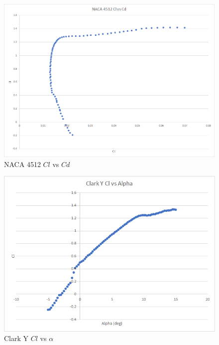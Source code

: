 \documentclass{article}
\begin{document}
\begin{figure}[!h]
\begin{center}
	\includegraphics[scale=0.7]{NACA4512clvscd_new.png}
	\caption{NACA 4512 $Cl$ vs $Cd$}
	\label{Figure 2:}
\end{center}
\end{figure}
\newpage

\begin{figure}[!h]
\begin{center}
	\includegraphics[scale=1]{Clarkyclvsalpha.png}
	\caption{Clark Y $Cl$ vs $\alpha$}
	\label{Figure 3:}
\end{center}
\end{figure}
\end{document}
